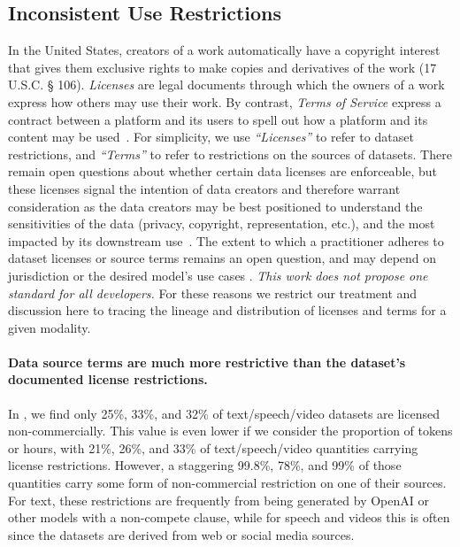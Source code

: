 \subsection{Inconsistent Use Restrictions}
\label{sec:use-restrictions}

In the United States, creators of a work automatically have a copyright interest that gives them exclusive rights to make copies and derivatives of the work (17 U.S.C. § 106). \emph{Licenses} are legal documents through which the owners of a work express how others may use their work. By contrast, \emph{Terms of Service} express a contract between a platform and its users to spell out how a platform and its content may be used~\citep{robinson2020beyond}.  
For simplicity, we use \emph{``Licenses''} to refer to dataset restrictions, and \emph{``Terms''} to refer to restrictions on the sources of datasets.
There remain open questions about whether certain data licenses are enforceable, but these licenses signal the intention of data creators and therefore warrant consideration as the data creators may be best positioned to understand the sensitivities of the data (privacy, copyright, representation, etc.), and the most impacted by its downstream use~\citep{morton2023licensed, lee2023talkin, mahari2023discit, mahari2023comment}.
The extent to which a practitioner adheres to dataset licenses or source terms remains an open question, and may depend on jurisdiction or the desired model's use cases \citep{lee2023talkin}. 
\emph{This work does not propose one standard for all developers.}
For these reasons we restrict our treatment and discussion here to tracing the lineage and distribution of licenses and terms for a given modality. 
    
\vspace{-2mm}
\paragraph{Data source terms are much more restrictive than the dataset's documented license restrictions.}
In , we find only 25\%, 33\%, and 32\% of text/speech/video datasets are licensed non-commercially.
This value is even lower if we consider the proportion of tokens or hours, with 21\%, 26\%, and 33\% of text/speech/video quantities carrying license restrictions.
However, a staggering 99.8\%, 78\%, and 99\% of those quantities carry some form of non-commercial restriction on one of their sources.
For text, these restrictions are frequently from being generated by OpenAI or other models with a non-compete clause, while for speech and videos this is often since the datasets are derived from web or social media sources.

